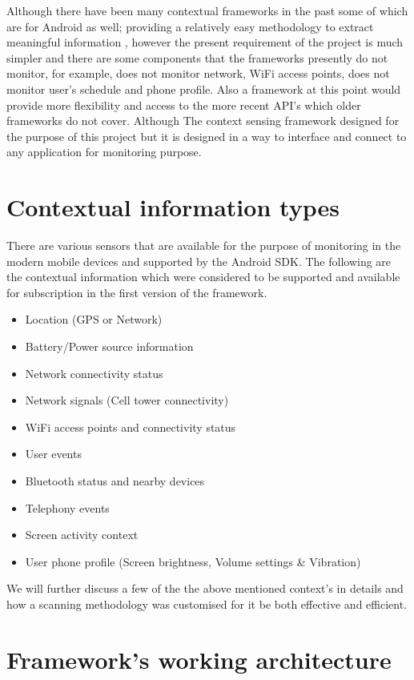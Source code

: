 \documentclass[12pt]{report}
\begin{document}
Although there have been many contextual frameworks in the past some of which are for Android as well; providing a relatively easy methodology to extract meaningful information \cite{novakextensible2013,rachuri2010emotionsense}, however the present requirement of the project is much simpler and there are some components that the frameworks presently do not monitor, for example, \cite{novakextensible2013} does not monitor network, WiFi access points, \cite{rachuri2010emotionsense} does not monitor user's schedule and phone profile. Also a framework at this point would provide more flexibility and access to the more recent API's which older frameworks do not cover. Although The context sensing framework designed for the purpose of this project but it is designed in a way to interface and connect to any application for monitoring purpose.

\section{Contextual information types}
\label{contextType}
There are various sensors that are available for the purpose of monitoring in the modern mobile devices and supported by the Android SDK. The following are the contextual information which were considered to be supported and available for subscription in the first version of the framework.

\begin{itemize}
\item Location (GPS or Network)
\item Battery/Power source information
\item Network connectivity status
\item Network signals (Cell tower connectivity)
\item WiFi access points and connectivity status
\item User events
\item Bluetooth status and nearby devices
\item Telephony events
\item Screen activity context
\item User phone profile (Screen brightness, Volume settings \& Vibration)
\end{itemize}

We will further discuss a few of the the above mentioned context's in details and how a scanning methodology was customised for it be both effective and efficient.
 
\section{Framework's working architecture}
\end{document}
